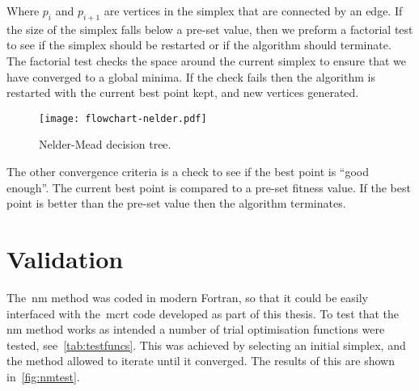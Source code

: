 Where $p_i$ and $p_{i+1}$ are vertices in the simplex that are connected by an edge. 
If the size of the simplex falls below a pre-set value, then we preform a factorial test to see if the simplex should be restarted or if the algorithm should terminate.
The factorial test checks the space around the current simplex to ensure that we have converged to a global minima.
If the check fails then the algorithm is restarted with the current best point kept, and new vertices generated.

\begin{figure}[!htbp]
    \centering
    \texttt{[image: flowchart-nelder.pdf]}
    \caption{Nelder-Mead decision tree.}
    \label{fig:NM-algo}
\end{figure}

The other convergence criteria is a check to see if the best point is ``good enough''.
The current best point is compared to a pre-set fitness value.
If the best point is better than the pre-set value then the algorithm terminates.

\FloatBarrier
\section{Validation}
The~\gls*{nm} method was coded in modern Fortran, so that it could be easily interfaced with the~\gls*{mcrt} code developed as part of this thesis.
To test that the \gls*{nm} method works as intended a number of trial optimisation functions were tested, see~\cref{tab:testfuncs}.
This was achieved by selecting an initial simplex, and the method allowed to iterate until it converged.
The results of this are shown in~\cref{fig:nmtest}.


